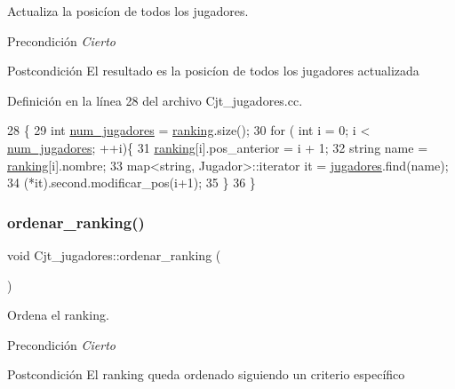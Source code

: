 Actualiza la posicíon de todos los jugadores. 

\begin{DoxyPrecond}{Precondición}
{\itshape Cierto} 
\end{DoxyPrecond}
\begin{DoxyPostcond}{Postcondición}
El resultado es la posicíon de todos los jugadores actualizada 
\end{DoxyPostcond}


Definición en la línea 28 del archivo Cjt\+\_\+jugadores.\+cc.


\begin{DoxyCode}
28                                   \{
29   \textcolor{keywordtype}{int} \hyperlink{class_cjt__jugadores_a4951d7691e67c44415fdcb3119dd4148}{num\_jugadores} = \hyperlink{class_cjt__jugadores_a2a64dd6a0c9315af038dfdb4c27da059}{ranking}.size();
30   \textcolor{keywordflow}{for} ( \textcolor{keywordtype}{int} i = 0; i < \hyperlink{class_cjt__jugadores_a4951d7691e67c44415fdcb3119dd4148}{num\_jugadores}; ++i)\{
31     \hyperlink{class_cjt__jugadores_a2a64dd6a0c9315af038dfdb4c27da059}{ranking}[i].pos\_anterior = i + 1;
32     \textcolor{keywordtype}{string} name = \hyperlink{class_cjt__jugadores_a2a64dd6a0c9315af038dfdb4c27da059}{ranking}[i].nombre;
33     map<string, Jugador>::iterator it = \hyperlink{class_cjt__jugadores_ae3fc5f98e0f343b039bd7dff0e616ecc}{jugadores}.find(name);
34     (*it).second.modificar\_pos(i+1);
35   \}
36 \}
\end{DoxyCode}
\mbox{\label{class_cjt__jugadores_a61d4c0806dcd9973fe8da0af7d39d672}} 
\subsubsection{\texorpdfstring{ordenar\+\_\+ranking()}{ordenar\_ranking()}}
{\footnotesize\ttfamily void Cjt\+\_\+jugadores\+::ordenar\+\_\+ranking (\begin{DoxyParamCaption}{ }\end{DoxyParamCaption})}



Ordena el ranking. 

\begin{DoxyPrecond}{Precondición}
{\itshape Cierto} 
\end{DoxyPrecond}
\begin{DoxyPostcond}{Postcondición}
El ranking queda ordenado siguiendo un criterio específico 
\end{DoxyPostcond}


